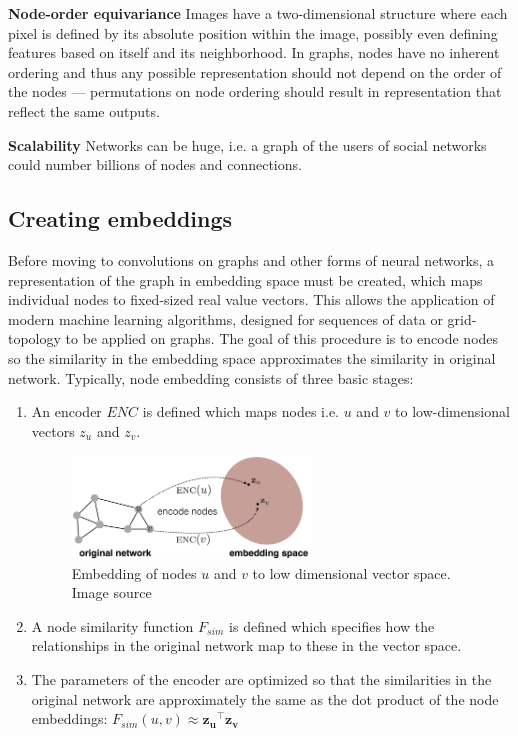 \textbf{Node-order equivariance} Images have a two-dimensional structure
where each pixel is defined by its absolute position within the image, possibly
even defining features based on itself and its neighborhood. In graphs, nodes
have no inherent ordering and thus any possible representation should not
depend on the order of the nodes --- permutations on node ordering
should result in representation that reflect the same outputs.

\textbf{Scalability} Networks can be huge, i.e. a graph of the users
of social networks could number billions of nodes and connections.

\subsection{Creating embeddings}

Before moving to convolutions on graphs and other forms of
neural networks, a representation of the graph in embedding space
must be created, which maps individual nodes to fixed-sized
real value vectors. This allows the application of modern  machine
learning algorithms, designed for sequences of data or grid-topology
to be applied on graphs. The goal of this procedure is to encode nodes
so the similarity in the embedding space approximates the similarity in
original network. Typically, node embedding consists of three basic
stages:
\begin{enumerate}
\item
  An encoder $ENC$ is defined which maps nodes i.e. $u$ and $v$ to
  low-dimensional vectors $z_u$ and $z_v$.
  \begin{figure}[H]
    \centering
    \includegraphics[width=0.6\textwidth]{Figures/chap_gnn/nodeEmbeddings.png}
    \caption{Embedding of nodes $u$ and $v$ to low dimensional vector space. Image source \cite{site:embeddings}}
    \label{fig:node_embedding}
  \end{figure}
\item
  A node similarity function $F_{sim}$ is defined which specifies how the relationships
  in the original network map to these in the vector space.
\item
  The parameters of the encoder are optimized so that the
  similarities in the original network are approximately the same
  as the dot product of the node embeddings: $F_{sim}(u,v) \approx \bm{z_u}^\intercal \bm{z_v}$
\end{enumerate}

